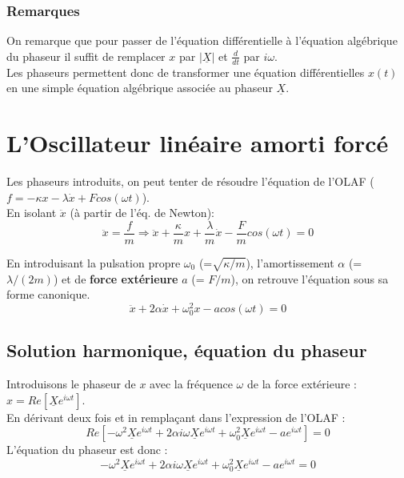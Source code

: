 \documentclass	[11pt, a4paper, openany]{book}
\begin{document}
\subsubsection*{Remarques}
On remarque que pour passer de l'équation différentielle à l'équation algébrique du phaseur il suffit de remplacer $x$ par $|\underline{X}|$ et $\frac{d}{dt}$ par $i\omega$.\\

Les phaseurs permettent donc de transformer une équation différentielles $x(t)$ en une simple équation algébrique associée au phaseur $\underline{X}$.

\section{L'Oscillateur linéaire amorti forcé}
Les phaseurs introduits, on peut tenter de résoudre l'équation de l'OLAF ($f = -\kappa x - \lambda \dot{x} + Fcos(\omega t)$).\\
En isolant $\ddot{x}$ (à partir de l'éq. de Newton):
\begin{equation}
\ddot{x} = \frac{f}{m} \Rightarrow \ddot{x} +\frac{\kappa}{m}x + \frac{\lambda}{m}\dot{x} - \frac{F}{m}cos(\omega t) = 0
\end{equation}

En introduisant la pulsation propre $\omega_0$ (=$\sqrt{\kappa/m}$), l'amortissement $\alpha$ (= $\lambda/(2m)$) et de \textbf{force extérieure} $a$ (= $F/m$), on retrouve l'équation sous sa forme canonique.
\begin{equation}
\ddot{x} + 2\alpha\dot{x} + \omega^2_0 x - a cos(\omega t) = 0
\end{equation}

\subsection{Solution harmonique, équation du phaseur}
Introduisons le phaseur de $x$ avec la fréquence $\omega$ de la force extérieure :$x = Re\left[\underline{X}e^{i\omega t} \right]$.\\
En dérivant deux fois et in remplaçant dans l'expression de l'OLAF :
\begin{equation}
Re\left[-\omega^2\underline{X}e^{i\omega t} + 2\alpha i \omega \underline{X}e^{i\omega t} + \omega_0^2 \underline{X}e^{i\omega t} - ae^{i\omega t}\right] = 0
\end{equation}
L'équation du phaseur est donc :
\begin{equation}
-\omega^2\underline{X}e^{i\omega t} + 2\alpha i \omega \underline{X}e^{i\omega t} + \omega_0^2 \underline{X}e^{i\omega t} - ae^{i\omega t} = 0
\end{equation}
\end{document}
